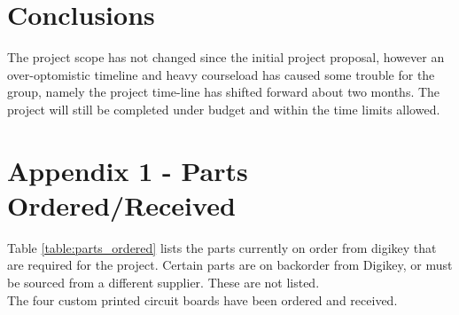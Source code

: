 \documentclass[12pt]{report}
\begin{document}
  \pagebreak

  \section{Conclusions}

  The project scope has not changed since the initial project proposal, however an over-optomistic timeline and heavy courseload has caused some trouble for the group, namely the project time-line has shifted forward about two months. The project will still be completed under budget and within the time limits allowed. 

  \pagebreak

  \section*{Appendix 1 - Parts Ordered/Received}

  Table \ref{table:parts_ordered} lists the parts currently on order from digikey that are required for the project. Certain parts are on backorder from Digikey, or must be sourced from a different supplier. These are not listed.\\

  The four custom printed circuit boards have been ordered and received.
\end{document}
